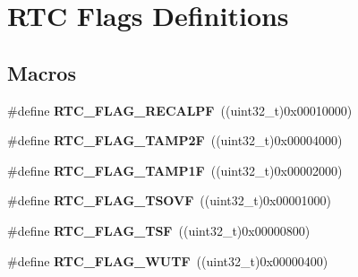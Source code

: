 \hypertarget{group___r_t_c___flags___definitions}{}\section{R\+TC Flags Definitions}
\label{group___r_t_c___flags___definitions}
\subsection*{Macros}
\begin{DoxyCompactItemize}
\item 
\#define {\bfseries R\+T\+C\+\_\+\+F\+L\+A\+G\+\_\+\+R\+E\+C\+A\+L\+PF}~((uint32\+\_\+t)0x00010000)\hypertarget{group___r_t_c___flags___definitions_ga01cba90a7ca51a928f72d28b6fe0d2ac}{}\label{group___r_t_c___flags___definitions_ga01cba90a7ca51a928f72d28b6fe0d2ac}

\item 
\#define {\bfseries R\+T\+C\+\_\+\+F\+L\+A\+G\+\_\+\+T\+A\+M\+P2F}~((uint32\+\_\+t)0x00004000)\hypertarget{group___r_t_c___flags___definitions_ga5ca385acdd6a179336d4ce661dd02137}{}\label{group___r_t_c___flags___definitions_ga5ca385acdd6a179336d4ce661dd02137}

\item 
\#define {\bfseries R\+T\+C\+\_\+\+F\+L\+A\+G\+\_\+\+T\+A\+M\+P1F}~((uint32\+\_\+t)0x00002000)\hypertarget{group___r_t_c___flags___definitions_ga3abf1af75c6ae88ddabe4b8a26634f99}{}\label{group___r_t_c___flags___definitions_ga3abf1af75c6ae88ddabe4b8a26634f99}

\item 
\#define {\bfseries R\+T\+C\+\_\+\+F\+L\+A\+G\+\_\+\+T\+S\+O\+VF}~((uint32\+\_\+t)0x00001000)\hypertarget{group___r_t_c___flags___definitions_ga74656ea8ff41be61a3734dc27367e039}{}\label{group___r_t_c___flags___definitions_ga74656ea8ff41be61a3734dc27367e039}

\item 
\#define {\bfseries R\+T\+C\+\_\+\+F\+L\+A\+G\+\_\+\+T\+SF}~((uint32\+\_\+t)0x00000800)\hypertarget{group___r_t_c___flags___definitions_ga9b9ac7de7718bfe0ff77e1fd1193744b}{}\label{group___r_t_c___flags___definitions_ga9b9ac7de7718bfe0ff77e1fd1193744b}

\item 
\#define {\bfseries R\+T\+C\+\_\+\+F\+L\+A\+G\+\_\+\+W\+U\+TF}~((uint32\+\_\+t)0x00000400)\hypertarget{group___r_t_c___flags___definitions_gafcadab331b0193e82c7f6b037044f194}{}\label{group___r_t_c___flags___definitions_gafcadab331b0193e82c7f6b037044f194}


\end{DoxyCompactItemize}
